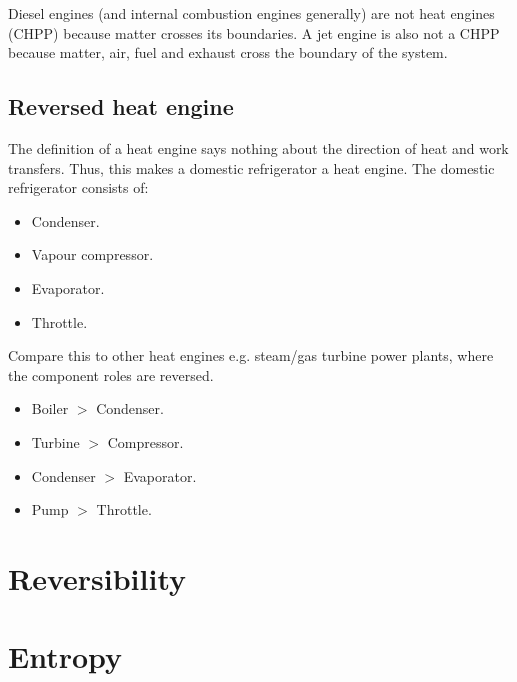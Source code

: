 \documentclass[class=report, crop=false, 12pt,a4paper]{standalone}
\begin{document}
Diesel engines (and internal combustion engines generally) are not heat engines (CHPP) because matter crosses its boundaries. A jet engine is also not a CHPP because matter, air, fuel and exhaust cross the boundary of the system.
\subsection{Reversed heat engine}
The definition of a heat engine says nothing about the direction of heat and work transfers. Thus, this makes a domestic refrigerator a heat engine. The domestic refrigerator consists of: 
\begin{multicols}{2}
  \begin{itemize}[noitemsep]
    \item Condenser.
    \item Vapour compressor.
    \item Evaporator.
    \item Throttle.
  \end{itemize}
\end{multicols}
Compare this to other heat engines e.g. steam/gas turbine power plants, where the component roles are reversed.
\begin{multicols}{2}
  \begin{itemize}[noitemsep]
    \item Boiler $>$ Condenser.
    \item Turbine $>$ Compressor.
    \item Condenser $>$ Evaporator.
    \item Pump $>$ Throttle.
  \end{itemize}
\end{multicols}
\section{Reversibility}
\section{Entropy}
\end{document}
